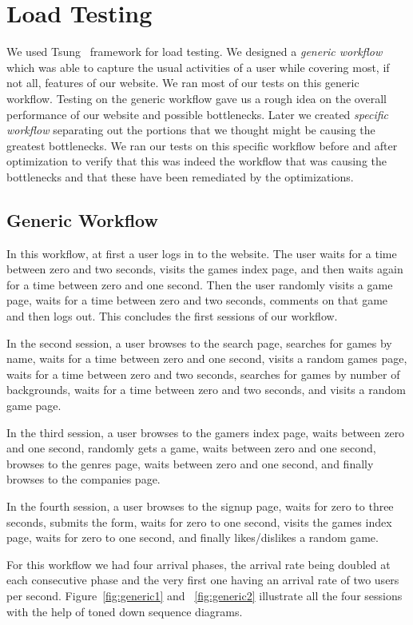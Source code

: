 \chapter{Load Testing}
We used Tsung~\cite{tsung} framework for load testing. We designed a \textit{generic workflow} which was able to capture the usual activities of a user while covering most, if not all, features of our website. We ran most of our tests on this generic workflow. Testing on the generic workflow gave us a rough idea on the overall performance of our website and possible bottlenecks. Later we created \textit{specific workflow} separating out the portions that we thought might be causing the greatest bottlenecks. We ran our tests on this specific workflow before and after optimization to verify that this was indeed the workflow that was causing the bottlenecks and that these have been remediated by the optimizations.

\section{Generic Workflow}\label{sec:generic-workflow}
In this workflow, at first a user logs in to the website. The user waits for a time between zero and two seconds, visits the games index page, and then waits again for a time between zero and one second. Then the user randomly visits a game page, waits for a time between zero and two seconds, comments on that game and then logs out. This concludes the first sessions of our workflow. 

In the second session, a user browses to the search page, searches for games by name, waits for a time between zero and one second, visits a random games page, waits for a time between zero and two seconds, searches for games by number of backgrounds, waits for a time between zero and two seconds, and visits a random game page. 

In the third session, a user browses to the gamers index page, waits between zero and one second, randomly gets a game, waits between zero and one second, browses to the genres page, waits between zero and one second, and finally browses to the companies page.

In the fourth session, a user browses to the signup page, waits for zero to three seconds, submits the form, waits for zero to one second, visits the games index page, waits for zero to one second, and finally likes/dislikes a random game.

For this workflow we had four arrival phases, the arrival rate being doubled at each consecutive phase and the very first one having an arrival rate of two users per second. Figure~\ref{fig:generic1} and ~\ref{fig:generic2} illustrate all the four sessions with the help of toned down sequence diagrams.

